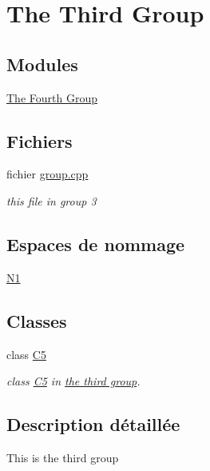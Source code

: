 \hypertarget{group__group3}{}\section{The Third Group}
\label{group__group3}
\subsection*{Modules}
\begin{DoxyCompactItemize}
\item 
\hyperlink{group__group4}{The Fourth Group}
\end{DoxyCompactItemize}
\subsection*{Fichiers}
\begin{DoxyCompactItemize}
\item 
fichier \hyperlink{group_8cpp}{group.\+cpp}
\begin{DoxyCompactList}\small\item\em this file in group 3 \end{DoxyCompactList}\end{DoxyCompactItemize}
\subsection*{Espaces de nommage}
\begin{DoxyCompactItemize}
\item 
 \hyperlink{namespace_n1}{N1}
\end{DoxyCompactItemize}
\subsection*{Classes}
\begin{DoxyCompactItemize}
\item 
class \hyperlink{class_c5}{C5}
\begin{DoxyCompactList}\small\item\em class \hyperlink{class_c5}{C5} in \hyperlink{group__group3}{the third group}. \end{DoxyCompactList}\end{DoxyCompactItemize}


\subsection{Description détaillée}
This is the third group 